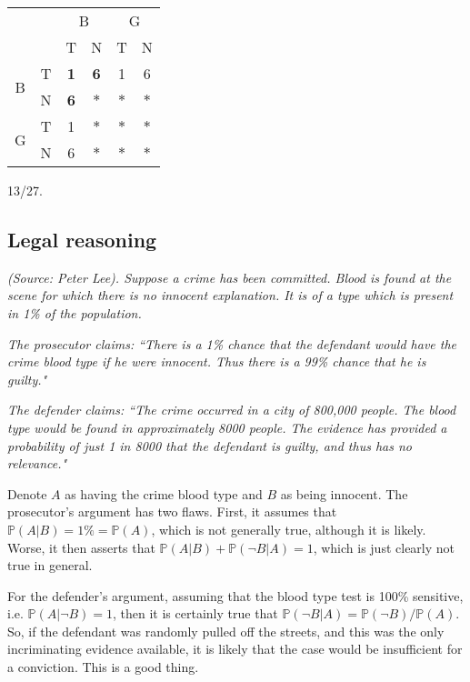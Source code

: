 \begin{table}[!h]
\centering
    \begin{tabular}{cc|cccc}
    &   & \multicolumn{2}{c}{B}   & \multicolumn{2}{c}{G} \\
    &   & T          & N          & T         & N         \\ \hline
\multirow{2}{*}{B} & T & \textbf{1} & \textbf{6} & 1         & 6         \\
    & N & \textbf{6} & $\ast$     & $\ast$    & $\ast$    \\
\multirow{2}{*}{G} & T & 1          & $\ast$     & $\ast$    & $\ast$    \\
    & N & 6          & $\ast$     & $\ast$    & $\ast$   
\end{tabular}
\end{table}

13/27.

\subsection{Legal reasoning}
\textit{(Source: Peter Lee). Suppose a crime has been committed. Blood is found at the scene for which there is no innocent explanation. It is of a type which is present in 1\% of the population.}

\textit{The prosecutor claims: ``There is a 1\% chance that the defendant would have the crime blood type if he were innocent. Thus there is a 99\% chance that he is guilty."}

\textit{The defender claims: ``The crime occurred in a city of 800,000 people. The blood type would be found in approximately 8000 people. The evidence has provided a probability of just 1 in 8000 that the defendant is guilty, and thus has no relevance."}

Denote $A$ as having the crime blood type and $B$ as being innocent. The prosecutor's argument has two flaws. First, it assumes that $\mathbb{P}(A|B) = 1\% = \mathbb{P}(A)$, which is not generally true, although it is likely. Worse, it then asserts that $\mathbb{P}(A|B) + \mathbb{P}(\neg B|A) = 1$, which is just clearly not true in general.

For the defender's argument, assuming that the blood type test is 100\% sensitive, i.e. $\mathbb{P}(A|\neg B) = 1$, then it is certainly true that $\mathbb{P}(\neg B|A) = \mathbb{P}(\neg B)/\mathbb{P}(A)$. So, if the defendant was randomly pulled off the streets, and this was the only incriminating evidence available, it is likely that the case would be insufficient for a conviction. This is a good thing.

